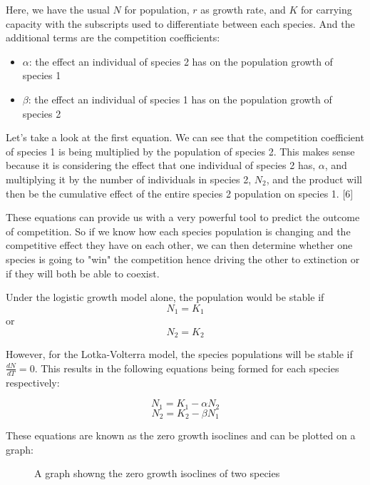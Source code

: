 \documentclass{article}
\begin{document}
Here, we have the usual $N$ for population, $r$ as growth rate, and $K$ for carrying capacity with the subscripts used to differentiate between each species. And the additional terms are the competition coefficients:

\begin{itemize}
\item \textbf{$\alpha$}: the effect an individual of species 2 has on the population growth of species 1
\item \textbf{$\beta$}: the effect an individual of species 1 has on the population growth of species 2
\end{itemize}

Let's take a look at the first equation. We can see that the competition coefficient of species 1 is being multiplied by the population of species 2. This makes sense because it is considering the effect that one individual of species 2 has, $\alpha$, and multiplying it by the number of individuals in species 2, $N_{2}$, and the product will then be the cumulative effect of the entire species 2 population on species 1. [6]

These equations can provide us with a very powerful tool to predict the outcome of competition. So if we know how each species population is changing and the competitive effect they have on each other, we can then determine whether one species is going to "win" the competition hence driving the other to extinction or if they will both be able to coexist.

Under the logistic growth model alone, the population would be stable if
$$N_{1}=K_{1}$$ or $$N_{2}=K_{2}$$

However, for the Lotka-Volterra model, the species populations will be stable if $\frac{dN}{dT}=0$. This results in the following equations being formed for each species respectively:

$$N_{1}=K_{1}-\alpha N_{2}$$
$$N_{2}=K_{2}- \beta N_{1}$$

These equations are known as the zero growth isoclines and can be plotted on a graph:

\begin{figure}[H]
\begin{center}
\end{center}
\caption{A graph showng the zero growth isoclines of two species}
\end{figure}
\end{document}

